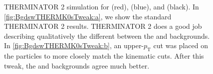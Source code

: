 \documentclass[../AnalysisNoteJBuxton.tex]{subfiles}
\begin{document}
\begin{figure}[h!]
  \centering
  \caption[Backgrounds with THERMINATOR, \Ks Tweak]{THERMINATOR 2 simulation for \LamKchP (red), \LamKchM (blue), and \LamKs (black).  In \ref{fig:BgdswTHERMK0sTweak:a}, we show the standard THERMINATOR 2 results.  THERMINATOR 2 does a good job describing qualitatively the different between the \LamKpm and \LamKs backgrounds.  In \ref{fig:BgdswTHERMK0sTweak:b}, an upper-$p_{\mathrm{T}}$ cut was placed on the \Ks particles to more closely match the \Kpm kinematic cuts.  After this tweak, the \LamKpm and \LamKs backgrounds agree much better.}
  \label{fig:BgdswTHERMK0sTweak}
\end{figure}
\end{document}
